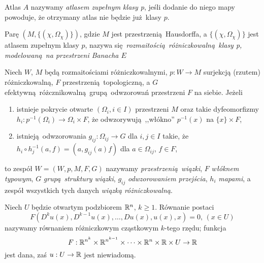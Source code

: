 \begin{definicja}\cite[s. 253]{maurin2}
    Atlas \(A\) nazywamy \emph{atlasem zupełnym klasy p}, jeśli dodanie do niego mapy powoduje, że
    otrzymany atlas nie będzie już klasy \(p\).
\end{definicja}
\begin{definicja}\cite[s. 253]{maurin2}
    Parę \((M, \{(\chi, \Omega_{\chi})\})\), gdzie \(M\) jest przestrzenią Hausdorffa, a \(\{(\chi, 
        \Omega_\chi)\}\) jest atlasem zupełnym klasy \(p\), nazywa
        się \emph{rozmaitością różniczkowalną klasy p, modelowaną na przestrzeni Banacha \(E\)}
\end{definicja}

\begin{definicja}\cite[s. 300]{maurin2}
    Niech \(W\), \(M\) będą rozmaitościami różniczkowalnymi, \(p: W \rightarrow M\) surjekcją
    (rzutem) różniczkowalną, \(F\) przestrzenią topologiczną, a \(G\)
    efektywną różcznikowalną grupą odwzorowań przestrzeni \(F\) na siebie. Jeżeli
    \begin{enumerate}[label=(\alph*)]
        \item istnieje pokrycie otwarte \((\Omega_i, i\in I)\) przestrzeni \(M\) oraz takie
            dyfeomorfizmy \(h_i: p^{-1}(\Omega_i) \rightarrow \Omega_i \times F\), że
            odwzorywują ,,włókno'' \(p^{-1}(x)\) na \(\{x\} \times F\),
        \item istnieją odwzorowania \(g_{ij}: \Omega_{ij} \rightarrow G\) dla \(i, j \in I\) takie,
            że \(h_i \circ h_j^{-1}(a, f) = (a, g_{ij}(a)f)\) dla \(a\in \Omega_{ij}\), \(f \in F\),
    \end{enumerate}
            to zespół \(W = (W, p, M, F, G)\) nazywamy \emph{przestrzenią wiązki}, \(F\)
            \emph{włóknem typowym},
            \(G\) \emph{grupą struktury wiązki}, \(g_{ij}\) \emph{odwzorowaniem przejścia}, \(h_i\)
            \emph{mapami}, a
            zespół wszystkich tych danych \emph{wiązką różniczkowalną}.
\end{definicja}

\begin{definicja}\cite[s. 17]{evans}
    Niech \(U\) będzie otwartym podzbiorem \(\mathbb{R}^n\), \(k \geq 1\).
    Równanie postaci
    \begin{equation} \label{eq:PDE}
        F(D^k u(x), D^{k-1} u(x), \dots, D u(x), u(x), x) = 0, \, (x\in U)
    \end{equation}
    nazywamy równaniem różniczkowym cząstkowym \(k\)-tego rzędu; funkcja
    \begin{equation*}
        F: \mathbb{R}^{n^k} \times \mathbb{R}^{n^{k-1}} \times \dots \times \mathbb{R}^n \times \mathbb{R} \times U \rightarrow \mathbb{R}
    \end{equation*} jest dana, zaś \(u: U \rightarrow \mathbb{R}\) jest niewiadomą.
\end{definicja}

